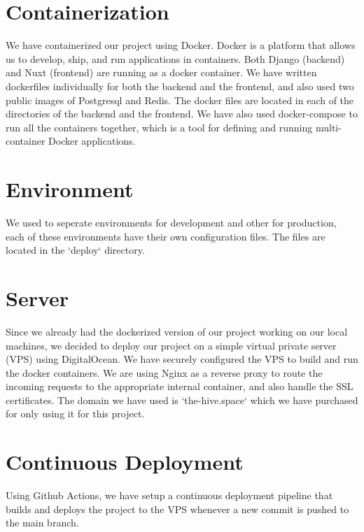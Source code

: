 \section{Containerization}
We have containerized our project using Docker. Docker is a platform that allows us to develop, ship, and run applications in containers.
Both Django (backend) and Nuxt (frontend) are running as a docker container.
We have written dockerfiles individually for both the backend and the frontend, and also used two public images of Postgresql and Redis.
The docker files are located in each of the directories of the backend and the frontend.
We have also used docker-compose to run all the containers together, which is a tool for defining and running multi-container Docker applications.

\section{Environment}
We used to seperate environments for development and other for production, each of these environments have their own configuration files.
The files are located in the `deploy` directory.


\section{Server}
Since we already had the dockerized version of our project working on our local machines, we decided to deploy our project on a simple virtual private server (VPS) using DigitalOcean.
We have securely configured the VPS to build and run the docker containers.
We are using Nginx as a reverse proxy to route the incoming requests to the appropriate internal container, and also handle the SSL certificates.
The domain we have used is `the-hive.space` which we have purchased for only using it for this project.

\section{Continuous Deployment}
Using Github Actions, we have setup a continuous deployment pipeline that builds and deploys the project to the VPS whenever a new commit is pushed to the main branch.
